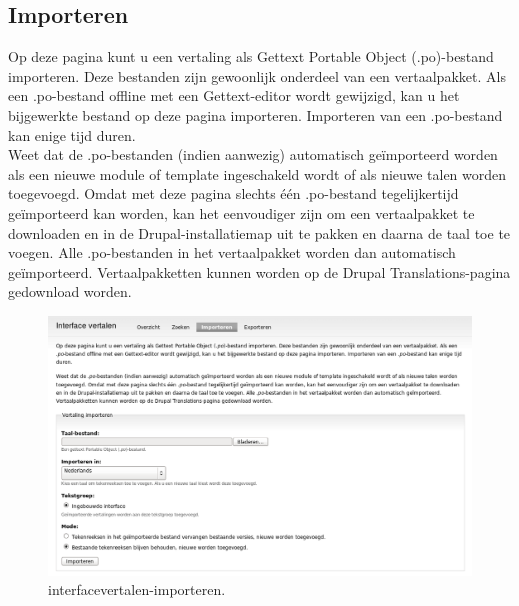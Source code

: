 \subsection{Importeren} 
Op deze pagina kunt u een vertaling als Gettext Portable Object (.po)-bestand importeren. 
Deze bestanden zijn gewoonlijk onderdeel van een vertaalpakket. Als een .po-bestand 
offline met een Gettext-editor wordt gewijzigd, kan u het bijgewerkte bestand op deze pagina 
importeren. Importeren van een .po-bestand kan enige tijd duren.
\\
Weet dat de .po-bestanden (indien aanwezig) automatisch ge\"importeerd worden
als een nieuwe module of template ingeschakeld wordt of als nieuwe talen worden toegevoegd. 
Omdat met deze pagina slechts \'e\'en .po-bestand tegelijkertijd ge\"importeerd
kan worden, kan het eenvoudiger zijn om een vertaalpakket te downloaden en in de Drupal-installatiemap 
uit te pakken en daarna de taal toe te voegen. Alle .po-bestanden in het vertaalpakket 
worden dan automatisch ge\"importeerd. Vertaalpakketten kunnen worden op de
Drupal Translations-pagina gedownload worden. \begin{figure}[!h]
    \centering
   \includegraphics[scale=0.3,angle=0]{interfacevertalen-importeren}
   \caption{interfacevertalen-importeren.\label{white}}
 \end{figure}
 
